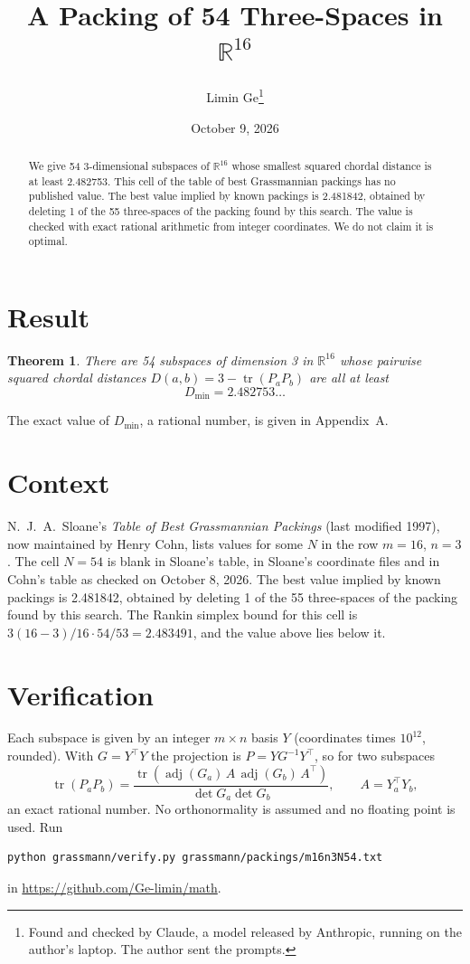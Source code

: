 \documentclass[11pt,a4paper]{article}
\title{A Packing of 54 Three-Spaces in $\mathbb{R}^{16}$}
\author{Limin Ge\thanks{Found and checked by Claude, a model released by Anthropic, running on the author's laptop. The author sent the prompts.}}
\date{October 9, 2026}
\newtheorem*{theorem}{Theorem}
\begin{document}
\maketitle
\begin{abstract}
We give 54 3-dimensional subspaces of $\mathbb{R}^{16}$ whose smallest squared chordal distance is at least 2.482753. This cell of the table of best Grassmannian packings has no published value. The best value implied by known packings is 2.481842, obtained by deleting 1 of the 55 three-spaces of the packing found by this search. The value is checked with exact rational arithmetic from integer coordinates. We do not claim it is optimal.
\end{abstract}

\section{Result}
\begin{theorem}
There are 54 subspaces of dimension 3 in $\mathbb{R}^{16}$ whose pairwise squared chordal distances $D(a,b) = 3 - \operatorname{tr}(P_aP_b)$ are all at least
\[ D_{\min} = 2.482753\ldots \]
\end{theorem}
The exact value of $D_{\min}$, a rational number, is given in Appendix~A.


\section{Context}
N.~J.~A.~Sloane's \emph{Table of Best Grassmannian Packings} (last modified 1997), now maintained by Henry Cohn, lists values for some $N$ in the row $m=16$, $n=3$. The cell $N=54$ is blank in Sloane's table, in Sloane's coordinate files and in Cohn's table as checked on October 8, 2026. The best value implied by known packings is 2.481842, obtained by deleting 1 of the 55 three-spaces of the packing found by this search. The Rankin simplex bound for this cell is $3(16-3)/16\cdot 54/53 = 2.483491$, and the value above lies below it.


\section{Verification}
Each subspace is given by an integer $m\times n$ basis $Y$ (coordinates times $10^{12}$, rounded). With $G=Y^\top Y$ the projection is $P=YG^{-1}Y^\top$, so for two subspaces
\[ \operatorname{tr}(P_aP_b)=\frac{\operatorname{tr}(\operatorname{adj}(G_a)\,A\,\operatorname{adj}(G_b)\,A^\top)}{\det G_a\det G_b},\qquad A=Y_a^\top Y_b, \]
an exact rational number. No orthonormality is assumed and no floating point is used. Run
\begin{verbatim}
python grassmann/verify.py grassmann/packings/m16n3N54.txt
\end{verbatim}
in \url{https://github.com/Ge-limin/math}.
\end{document}

